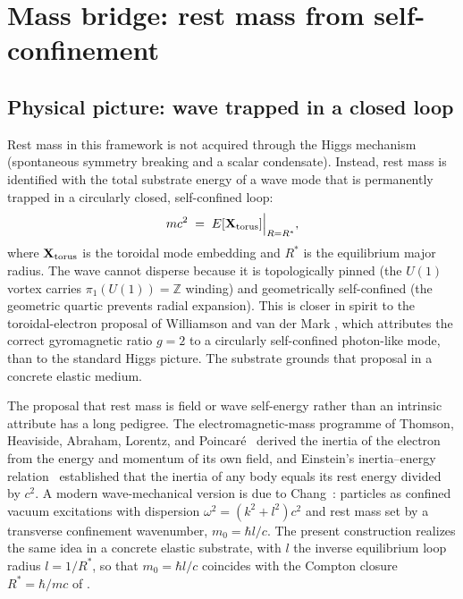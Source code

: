 \section{Mass bridge: rest mass from self-confinement}
\label{sec:mass}

\subsection{Physical picture: wave trapped in a closed loop}
\label{subsec:mass-picture}

Rest mass in this framework is not acquired through the Higgs mechanism (spontaneous symmetry
breaking and a scalar condensate).
Instead, rest mass is identified with the total substrate energy of a wave mode that is permanently
trapped in a circularly closed, self-confined loop:
\begin{equation}
  mc^2 \;=\; E[{\mathbf{X}_{\mathrm{torus}}}]\Big|_{R=R^*},
  \label{eq:mass-energy}
\end{equation}
where $\mathbf{X}_{\mathrm{torus}}$ is the toroidal mode embedding and $R^*$ is the equilibrium major
radius.
The wave cannot disperse because it is topologically pinned (the $U(1)$ vortex carries
$\pi_1(U(1))=\mathbb{Z}$ winding) and geometrically self-confined (the geometric quartic prevents
radial expansion).
This is closer in spirit to the toroidal-electron proposal of Williamson and van der Mark
\citep{HuygensOptics2025}, which attributes the correct gyromagnetic ratio $g=2$ to a circularly
self-confined photon-like mode, than to the standard Higgs picture.
The substrate grounds that proposal in a concrete elastic medium.

The proposal that rest mass is field or wave self-energy rather than an intrinsic attribute has a
long pedigree.
The electromagnetic-mass programme of Thomson, Heaviside, Abraham, Lorentz, and
Poincar\'{e}~\citep{Thomson1881,Heaviside1889,Abraham1902,Lorentz1904,Poincare1900} derived the
inertia of the electron from the energy and momentum of its own field, and Einstein's
inertia--energy relation~\citep{Einstein1905inertia} established that the inertia of any body
equals its rest energy divided by $c^2$.
A modern wave-mechanical version is due to Chang~\citep{Chang2018}: particles as confined vacuum
excitations with dispersion $\omega^2=(k^2+l^2)c^2$ and rest mass set by a transverse confinement
wavenumber, $m_0=\hbar l/c$.
The present construction realizes the same idea in a concrete elastic substrate, with $l$ the
inverse equilibrium loop radius $l=1/R^*$, so that $m_0=\hbar l/c$ coincides with the Compton
closure $R^*=\hbar/mc$ of .

